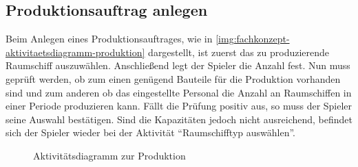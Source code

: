 \subsection{Produktionsauftrag anlegen}
\label{sec:fachkonzept-aktivitaetsdiagramm}

Beim Anlegen eines Produktionsauftrages, wie in \vref{img:fachkonzept-aktivitaetsdiagramm-produktion} dargestellt, ist zuerst das zu produzierende Raumschiff auszuwählen. Anschließend legt der Spieler die Anzahl fest. Nun muss geprüft werden, ob zum einen genügend Bauteile für die Produktion vorhanden sind und zum anderen ob das eingestellte Personal die Anzahl an Raumschiffen in einer Periode produzieren kann. Fällt die Prüfung positiv aus, so muss der Spieler seine Auswahl bestätigen. Sind die Kapazitäten jedoch nicht ausreichend, befindet sich der Spieler wieder bei der Aktivität “Raumschifftyp auswählen”.

\begin{figure}[h]
  \centering
  \caption{Aktivitätsdiagramm zur Produktion}
  \label{img:fachkonzept-aktivitaetsdiagramm-produktion}
\end{figure}
